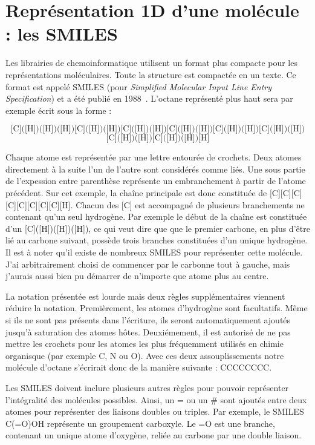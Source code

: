 \section{Représentation 1D d'une molécule : les SMILES}

Les librairies de chemoinformatique utilisent un format plus compacte pour les représentations moléculaires.
Toute la structure est compactée en un texte.
Ce format est appelé SMILES (pour \textit{Simplified Molecular Input Line Entry Specification}) et a été publié en 1988~\cite{weininger_smiles_1988}.
L'octane représenté plus haut sera par exemple écrit sous la forme :

\[\text{[C]([H])([H])([H])[C]([H])([H])[C]([H])([H])[C]([H])([H])[C]([H])([H])[C]([H])([H])}\]
\[\text{[C]([H])([H])[C]([H])([H])[H]}\]

Chaque atome est représentée par une lettre entourée de crochets.
Deux atomes directement à la suite l'un de l'autre sont considérés comme liés.
Une sous partie de l'expession entre parenthèse représente un embranchement à partir de l'atome précédent.
Sur cet exemple, la chaîne principale est donc constituée de [C][C][C][C][C][C][C][C][H].
Chacun des [C] est accompagné de plusieurs branchements ne contenant qu'un seul hydrogène.
Par exemple le début de la chaîne est constituée d'un [C]([H])([H])([H]), ce qui veut dire que que le premier carbone, en plus d'être lié au carbone suivant, possède trois branches constituées d'un unique hydrogène.
Il est à noter qu'il existe de nombreux SMILES pour représenter cette molécule.
J'ai arbitrairement choisi de commencer par le carbonne tout à gauche, mais j'aurais aussi bien pu démarrer de n'importe que atome plus au centre.

La notation présentée est lourde mais deux règles supplémentaires viennent réduire la notation.
Premièrement, les atomes d'hydrogène sont facultatifs.
Même si ils ne sont pas présents dans l'écriture, ils seront automatiquement ajoutés jusqu'à saturation des atomes hôtes.
Deuxiémement, il est autorisé de ne pas mettre les crochets pour les atomes les plus fréquemment utilisés en chimie organisque (par exemple C, N ou O).
Avec ces deux assouplissements notre molécule d'octane s'écrirait donc de la manière suivante : CCCCCCCC.

Les SMILES doivent inclure plusieurs autres règles pour pouvoir représenter l'intégralité des molécules possibles.
Ainsi, un = ou un \# sont ajoutés entre deux atomes pour représenter des liaisons doubles ou triples.
Par exemple, le SMILES C(=O)OH représente un groupement carboxyle.
Le =O est une branche, contenant un unique atome d'oxygène, reliée au carbone par une double liaison.

